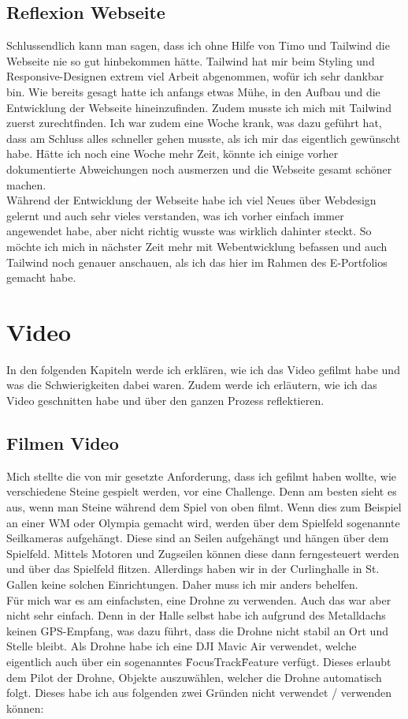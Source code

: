 \documentclass[11pt]{article}
\begin{document}
    \subsection{Reflexion Webseite}
    Schlussendlich kann man sagen, dass ich ohne Hilfe von Timo und Tailwind die Webseite nie so gut hinbekommen hätte. Tailwind hat mir
    beim Styling und Responsive-Designen extrem viel Arbeit abgenommen, wofür ich sehr dankbar bin. Wie bereits gesagt hatte ich anfangs etwas
    Mühe, in den Aufbau und die Entwicklung der Webseite hineinzufinden. Zudem musste ich mich mit Tailwind zuerst zurechtfinden. Ich war zudem
    eine Woche krank, was dazu geführt hat, dass am Schluss alles schneller gehen musste, als ich mir das eigentlich gewünscht habe. Hätte ich noch
    eine Woche mehr Zeit, könnte ich einige vorher dokumentierte Abweichungen noch ausmerzen und die Webseite gesamt schöner machen.\\
    Während der Entwicklung der Webseite habe ich viel Neues über Webdesign gelernt und auch sehr vieles verstanden, was ich vorher einfach
    immer angewendet habe, aber nicht richtig wusste was wirklich dahinter steckt. So möchte ich mich in nächster Zeit mehr mit Webentwicklung
    befassen und auch Tailwind noch genauer anschauen, als ich das hier im Rahmen des E-Portfolios gemacht habe.

    \pagebreak
    \section{Video}
    In den folgenden Kapiteln werde ich erklären, wie ich das Video gefilmt habe und was die Schwierigkeiten dabei waren. Zudem werde ich
    erläutern, wie ich das Video geschnitten habe und über den ganzen Prozess reflektieren.

    \subsection{Filmen Video}
    Mich stellte die von mir gesetzte Anforderung, dass ich gefilmt haben wollte, wie verschiedene Steine gespielt werden, vor eine Challenge.
    Denn am besten sieht es aus, wenn man Steine während dem Spiel von oben filmt. Wenn dies zum Beispiel an einer WM oder Olympia gemacht wird,
    werden über dem Spielfeld sogenannte Seilkameras aufgehängt. Diese sind an Seilen aufgehängt und hängen über dem Spielfeld. Mittels Motoren
    und Zugseilen können diese dann ferngesteuert werden und über das Spielfeld flitzen. Allerdings haben wir in der Curlinghalle in St. Gallen
    keine solchen Einrichtungen. Daher muss ich mir anders behelfen.\\
    Für mich war es am einfachsten, eine Drohne zu verwenden. Auch das war aber nicht sehr einfach. Denn in der Halle selbst habe ich aufgrund
    des Metalldachs keinen GPS-Empfang, was dazu führt, dass die Drohne nicht stabil an Ort und Stelle bleibt.
    Als Drohne habe ich eine DJI Mavic Air verwendet, welche eigentlich auch über ein sogenanntes \"FocusTrack\" Feature verfügt. Dieses erlaubt dem
    Pilot der Drohne, Objekte auszuwählen, welcher die Drohne automatisch folgt. Dieses habe ich aus folgenden zwei Gründen nicht verwendet
    / verwenden können:
\end{document}
